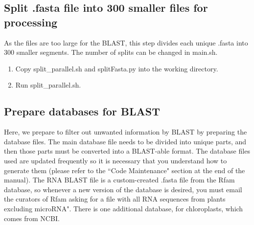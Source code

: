 \documentclass[12pt,titlepage]{article}
\begin{document}
\subsection{Split .fasta file into 300 smaller files for processing}
As the files are too large for the BLAST, this step divides each unique .fasta into 300 smaller segments. The number of splits can be changed in main.sh.
\begin{enumerate}
\item Copy split\_parallel.sh and splitFasta.py into the working directory.
\item Run split\_parallel.sh.
\end{enumerate}

\subsection{Prepare databases for BLAST}
Here, we prepare to filter out unwanted information by BLAST by preparing the database files. The main database file needs to be divided into unique parts, and then those parts must be converted into a BLAST-able format. The database files used are updated frequently so it is necessary that you understand how to generate them (please refer to the ``Code Maintenance" section at the end of the manual). The RNA BLAST file is a custom-created .fasta file from the Rfam database, so whenever a new version of the database is desired, you must email the curators of Rfam asking for a file with all RNA sequences from plants excluding microRNA". There is one additional database, for chloroplasts, which comes from NCBI. 
\end{document}
